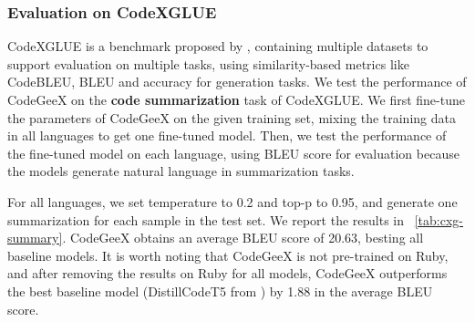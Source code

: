 \subsubsection{Evaluation on CodeXGLUE}
CodeXGLUE is a benchmark proposed by \cite{lu2021codexglue}, containing multiple datasets to support evaluation on multiple tasks, using similarity-based metrics like CodeBLEU, BLEU and accuracy for generation tasks.
We test the performance of CodeGeeX on the \textbf{code summarization} task of CodeXGLUE. 
We first fine-tune the parameters of CodeGeeX on the given training set, mixing the training data in all languages to get one fine-tuned model. Then, we test the performance of the fine-tuned model on each language, using BLEU score for evaluation because the models generate natural language in summarization tasks.

For all languages, we set temperature to 0.2 and top-p to 0.95, and generate one summarization for each sample in the test set. 
We report the results in \tableautorefname~\ref{tab:cxg-summary}. 
CodeGeeX obtains an average BLEU score of 20.63, besting all baseline models. It is worth noting that CodeGeeX is not pre-trained on Ruby, and after removing the results on Ruby for all models, CodeGeeX outperforms the best baseline model (DistillCodeT5 from \cite{wang2021codet5}) by 1.88 in the average BLEU score.

\begin{table}[ht]
    \centering
    \renewcommand{\arraystretch}{1.3}
    \caption{The results of \name on \textbf{code summarization} in CodeXGLUE benchmark~\citep{lu2021codexglue}. Six languages are considered, Ruby, JavaScript, Go, Python, Java, PHP. The metric is the BLEU score. * We don't have Ruby in the pretraining corpus.}
    \label{tab:cxg-summary}
\end{table}

